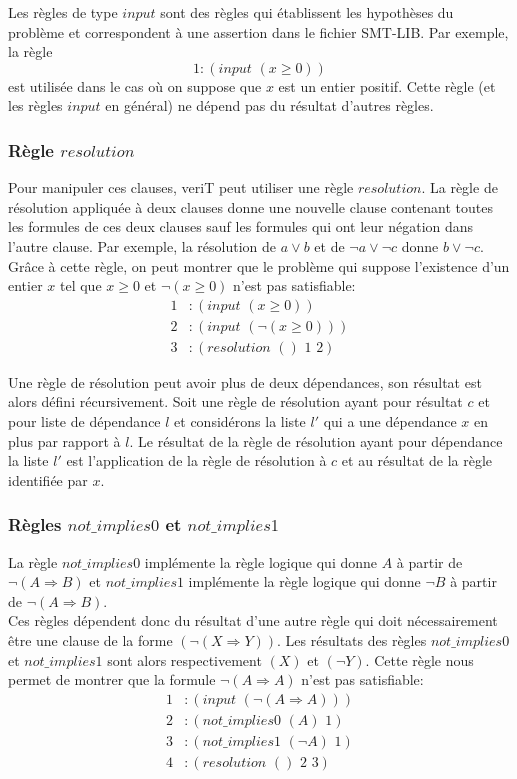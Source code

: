 \documentclass[11pt]{article}
\begin{document}
Les règles de type $input$ sont des règles qui établissent les hypothèses du problème et correspondent à une assertion dans le fichier SMT-LIB. Par exemple, la règle 
\[ 1:(input \,\, (x \geq 0)) \]
est utilisée dans le cas où on suppose que $x$ est un entier positif. Cette règle (et les règles $input$ en général) ne dépend pas du résultat d'autres règles.\\

\subsubsection{Règle $resolution$}

Pour manipuler ces clauses, veriT peut utiliser une règle $resolution$. La règle de résolution appliquée à deux clauses donne une nouvelle clause contenant toutes les formules de ces deux clauses sauf les formules qui ont leur négation dans l'autre clause. Par exemple, la résolution de $a \vee b$ et de $\neg a \vee \neg c$ donne $b \vee \neg c$. Grâce à cette règle, on peut montrer que le problème qui suppose l'existence d'un entier $x$ tel que $x \geq 0$ et $\neg (x \geq 0)$ n'est pas satisfiable: 
\begin{align*}
1&:(input \,\, ( x \geq 0)) \\
2&:(input \,\, (\neg (x \geq 0))) \\
3&:(resolution \,\,() \,\,1\,\, 2)
\end{align*}

Une règle de résolution peut avoir plus de deux dépendances, son résultat est alors défini récursivement. Soit une règle de résolution ayant pour résultat $c$ et pour liste de dépendance $l$ et considérons la liste $l'$ qui a une dépendance $x$ en plus par rapport à $l$. Le résultat de la règle de résolution ayant pour dépendance la liste $l'$ est l'application de la règle de résolution à $c$ et au résultat de la règle identifiée par $x$.


\subsubsection{Règles $not\_implies0$ et $not\_implies1$} \label{not_implies}
La règle $not\_implies0$ implémente la règle logique qui donne $A$ à partir de $\neg (A \Rightarrow B)$ et $not\_implies1$ implémente la règle logique qui donne $\neg B$ à partir de $\neg (A \Rightarrow B)$. \\

Ces règles dépendent donc du résultat d'une autre règle qui doit nécessairement être une clause de la forme $(\neg (X \Rightarrow Y))$. Les résultats des règles $not\_implies0$ et $not\_implies1$ sont alors respectivement $(X)$ et $(\neg Y)$. Cette règle nous permet de montrer que la formule $\neg (A \Rightarrow A)$ n'est pas satisfiable:
\begin{align*}
  1&:(input\,\, (\neg ( A \Rightarrow A))) \\
  2&:(not\_implies0\,\, (A)\,\, 1) \\
  3&:(not\_implies1\,\, (\neg A) \,\,1) \\
  4&:(resolution\,\, ()\,\, 2\,\, 3)
\end{align*}
\end{document}
